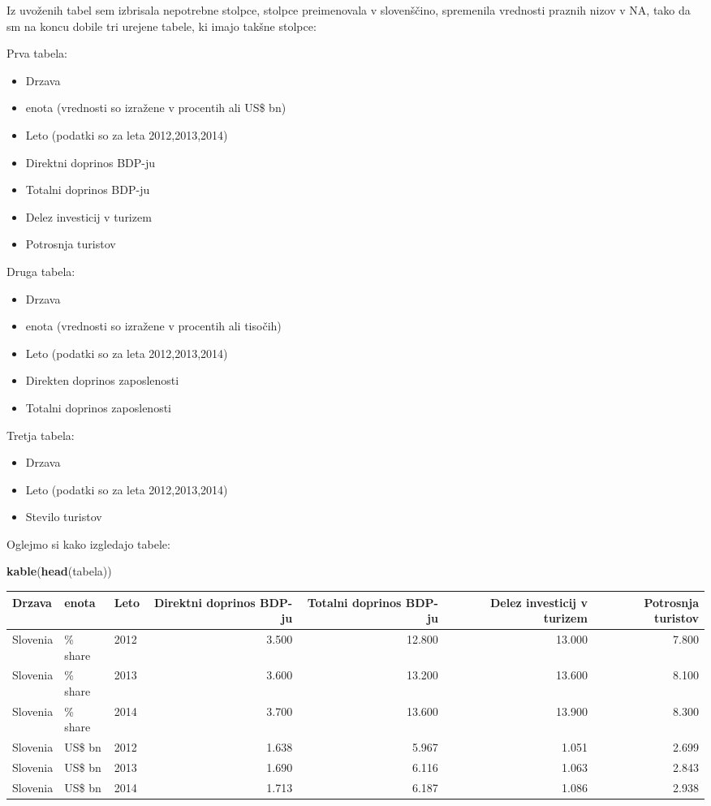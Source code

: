\documentclass[]{article}
\newenvironment{Shaded}{\begin{snugshade}}{\end{snugshade}}
\newcommand{\KeywordTok}[1]{\textcolor[rgb]{0.13,0.29,0.53}{\textbf{{#1}}}}
\newcommand{\NormalTok}[1]{{#1}}
\begin{document}
Iz uvoženih tabel sem izbrisala nepotrebne stolpce, stolpce preimenovala
v slovenščino, spremenila vrednosti praznih nizov v NA, tako da sm na
koncu dobile tri urejene tabele, ki imajo takšne stolpce:

Prva tabela:

\begin{itemize}
\itemsep1pt\parskip0pt
\item
  Drzava
\item
  enota (vrednosti so izražene v procentih ali US\$ bn)
\item
  Leto (podatki so za leta 2012,2013,2014)
\item
  Direktni doprinos BDP-ju
\item
  Totalni doprinos BDP-ju
\item
  Delez investicij v turizem
\item
  Potrosnja turistov
\end{itemize}

Druga tabela:

\begin{itemize}
\itemsep1pt\parskip0pt
\item
  Drzava
\item
  enota (vrednosti so izražene v procentih ali tisočih)
\item
  Leto (podatki so za leta 2012,2013,2014)
\item
  Direkten doprinos zaposlenosti
\item
  Totalni doprinos zaposlenosti
\end{itemize}

Tretja tabela:

\begin{itemize}
\itemsep1pt\parskip0pt
\item
  Drzava
\item
  Leto (podatki so za leta 2012,2013,2014)
\item
  Stevilo turistov
\end{itemize}

Oglejmo si kako izgledajo tabele:

\begin{Shaded}
\begin{Highlighting}[]
\KeywordTok{kable}\NormalTok{(}\KeywordTok{head}\NormalTok{(tabela))}
\end{Highlighting}
\end{Shaded}

\begin{longtable}[c]{@{}lllrrrr@{}}
\toprule
Drzava & enota & Leto & Direktni doprinos BDP-ju & Totalni doprinos
BDP-ju & Delez investicij v turizem & Potrosnja turistov\tabularnewline
\midrule
\endhead
Slovenia & \% share & 2012 & 3.500 & 12.800 & 13.000 &
7.800\tabularnewline
Slovenia & \% share & 2013 & 3.600 & 13.200 & 13.600 &
8.100\tabularnewline
Slovenia & \% share & 2014 & 3.700 & 13.600 & 13.900 &
8.300\tabularnewline
Slovenia & US\$ bn & 2012 & 1.638 & 5.967 & 1.051 & 2.699\tabularnewline
Slovenia & US\$ bn & 2013 & 1.690 & 6.116 & 1.063 & 2.843\tabularnewline
Slovenia & US\$ bn & 2014 & 1.713 & 6.187 & 1.086 & 2.938\tabularnewline
\bottomrule
\end{longtable}
\end{document}
